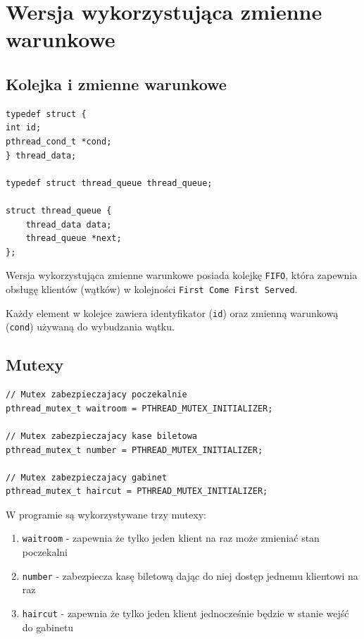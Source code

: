 \documentclass[12pt,a4paper]{article}
\begin{document}
	\section{Wersja wykorzystująca zmienne warunkowe}
	\subsection{Kolejka i zmienne warunkowe}
	
	\begin{center}
		\begin{minipage}{0.8\linewidth}
\begin{lstlisting}[caption = Struktura reprezentująca kolejkę.]
typedef struct {
int id;
pthread_cond_t *cond;
} thread_data;

typedef struct thread_queue thread_queue;

struct thread_queue {
    thread_data data;
    thread_queue *next;
};
\end{lstlisting}
		\end{minipage}
	\end{center}
		
	
	Wersja wykorzystująca zmienne warunkowe posiada kolejkę 
	\texttt{FIFO}, która zapewnia obsługę klientów (wątków) w kolejności 
	\texttt{First Come First Served}.
			
	Każdy element w kolejce zawiera identyfikator (\texttt{id}) oraz
	zmienną warunkową (\texttt{cond}) używaną do wybudzania wątku.
	
	\subsection{Mutexy}
	
	\begin{center}
		\begin{minipage}{0.8\linewidth}
\begin{lstlisting}[caption = Deklaracje mutexów.]
// Mutex zabezpieczajacy poczekalnie
pthread_mutex_t waitroom = PTHREAD_MUTEX_INITIALIZER;

// Mutex zabezpieczajacy kase biletowa
pthread_mutex_t number = PTHREAD_MUTEX_INITIALIZER;

// Mutex zabezpieczajacy gabinet
pthread_mutex_t haircut = PTHREAD_MUTEX_INITIALIZER;
\end{lstlisting}
		\end{minipage}
	\end{center}
	
	W programie są wykorzystywane trzy mutexy:
	\begin{enumerate}
		\item \texttt{waitroom} - zapewnia że tylko jeden klient na raz
			może zmieniać stan poczekalni
		\item \texttt{number} - zabezpiecza kasę biletową dając do niej
			dostęp jednemu klientowi na raz
		\item \texttt{haircut} - zapewnia że tylko jeden klient
			jednocześnie będzie w stanie wejść do gabinetu
	\end{enumerate}
	
\end{document}
